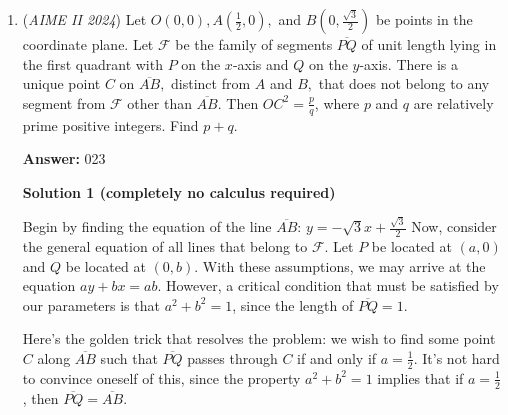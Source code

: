 \begin{enumerate}
 



\textbf{Solution 7 (similar to 2)}


 \[a^2b + a^2c + b^2a + b^2c + c^2a + c^2b = 6,000,000 \implies (a-100)^3 + (b-100)^3 + (c-100)^3 = 0\]

 Given those, it is easy to see that $c > 100$ for instance, in which we have the numbers of some form $(a-100)^3 + (b-100)^3 = (100-c)^3$ given or $c < 100$ in which we have $(a-100)^3 + (b-100)^3 = (c-100)^3$. Through Fermat's Last Theorem, we require one of these to equal 0, as otherwise no other solutions can exist. So, there are 3 ways to choose which one is 0, WLOG say $a$, and then we have $b+c = 200$ which has $\binom{201}{1} = 201$ solutions via stars and bars. In total, that is 603 solutions. We overcount $(100,100,100)$ twice so we have $\boxed{601}$ that work.

 


	\item (\textit{AIME II 2024}) Let $O(0,0),A(\frac{1}{2},0),$ and $B(0,\frac{\sqrt{3}}{2})$ be points in the coordinate plane. Let $\mathcal{F}$ be the family of segments $\overline{PQ}$ of unit length lying in the first quadrant with $P$ on the $x$-axis and $Q$ on the $y$-axis. There is a unique point $C$ on $\overline{AB},$ distinct from $A$ and $B,$ that does not belong to any segment from $\mathcal{F}$ other than $\overline{AB}$. Then $OC^2=\frac{p}{q}$, where $p$ and $q$ are relatively prime positive integers. Find $p+q$.


 
 \textbf{Answer: }023



\textbf{Solution 1 (completely no calculus required)}

Begin by finding the equation of the line $\overline{AB}$: $y= -\sqrt{3}x+\frac{\sqrt{3}}{2}$ Now, consider the general equation of all lines that belong to $\mathcal{F}$. Let $P$ be located at $(a,0)$ and $Q$ be located at $(0,b)$. With these assumptions, we may arrive at the equation $ay +bx =ab$. However, a critical condition that must be satisfied by our parameters is that $a^2+b^2=1$, since the length of $\overline{PQ}=1$. 

 Here's the golden trick that resolves the problem: we wish to find some point $C$ along $\overline{AB}$ such that $\overline{PQ}$ passes through $C$ if and only if $a=\frac{1}{2}$. It's not hard to convince oneself of this, since the property $a^2+b^2=1$ implies that if $a=\frac{1}{2}$, then $\overline{PQ}=\overline{AB}$.


\end{enumerate}
